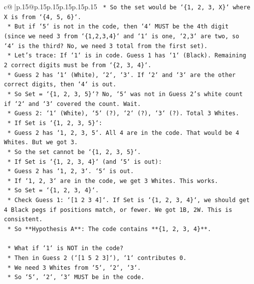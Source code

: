 \documentclass{article}
\begin{document}
{\begin{supertabular}{c@{$\;$}|p{.15\linewidth}@{}p{.15\linewidth}p{.15\linewidth}p{.15\linewidth}p{.15\linewidth}p{.15\linewidth}}
{{{\texttt{        *   So the set would be `\{1, 2, 3, X\}` where X is from `\{4, 5, 6\}`.} \\
\texttt{        *   But if `5` is not in the code, then `4` MUST be the 4th digit (since we need 3 from `\{1,2,3,4\}` and `1` is one, `2,3` are two, so `4` is the third? No, we need 3 total from the first set).} \\
\texttt{        *   Let's trace: If `1` is in code. Guess 1 has `1` (Black). Remaining 2 correct digits must be from `\{2, 3, 4\}`.} \\
\texttt{        *   Guess 2 has `1` (White), `2`, `3`. If `2` and `3` are the other correct digits, then `4` is out.} \\
\texttt{        *   So Set = `\{1, 2, 3, 5\}`? No, `5` was not in Guess 2's white count if `2` and `3` covered the count. Wait.} \\
\texttt{        *   Guess 2: `1` (White), `5` (?), `2` (?), `3` (?). Total 3 Whites.} \\
\texttt{        *   If Set is `\{1, 2, 3, 5\}`:} \\
\texttt{            *   Guess 2 has `1, 2, 3, 5`. All 4 are in the code. That would be 4 Whites. But we got 3.} \\
\texttt{            *   So the set cannot be `\{1, 2, 3, 5\}`.} \\
\texttt{        *   If Set is `\{1, 2, 3, 4\}` (and `5` is out):} \\
\texttt{            *   Guess 2 has `1, 2, 3`. `5` is out.} \\
\texttt{            *   If `1, 2, 3` are in the code, we get 3 Whites. This works.} \\
\texttt{            *   So Set = `\{1, 2, 3, 4\}`.} \\
\texttt{            *   Check Guess 1: `{[}1 2 3 4{]}`. If Set is `\{1, 2, 3, 4\}`, we should get 4 Black pegs if positions match, or fewer. We got 1B, 2W. This is consistent.} \\
\texttt{            *   So **Hypothesis A**: The code contains **\{1, 2, 3, 4\}**.} \\
\\ 
\texttt{    *   What if `1` is NOT in the code?} \\
\texttt{        *   Then in Guess 2 (`{[}1 5 2 3{]}`), `1` contributes 0.} \\
\texttt{        *   We need 3 Whites from `5`, `2`, `3`.} \\
\texttt{        *   So `5`, `2`, `3` MUST be in the code.} \\
}}}
\end{supertabular}}
\end{document}
